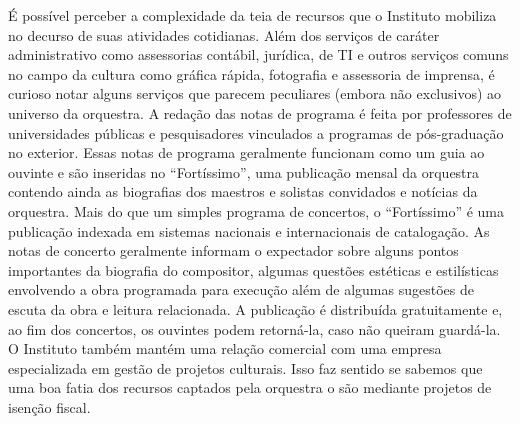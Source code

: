 \documentclass[a4paper, 12pt, openright, oneside, german, french, english, brazil]{abntex2}
\begin{document}






	É possível perceber a complexidade da teia de recursos que o Instituto mobiliza no decurso de suas atividades cotidianas. Além dos serviços de caráter administrativo como assessorias contábil, jurídica, de TI e outros serviços comuns no campo da cultura como gráfica rápida, fotografia e assessoria de imprensa, é curioso notar alguns serviços que parecem peculiares (embora não exclusivos) ao universo da orquestra. A redação das notas de programa é feita por professores de universidades públicas e pesquisadores vinculados a programas de pós-graduação no exterior. Essas notas de programa geralmente funcionam como um guia ao ouvinte e são inseridas no ``Fortíssimo'', uma publicação mensal da orquestra contendo ainda as biografias dos maestros e solistas convidados e notícias da orquestra. Mais do que um simples programa de concertos, o ``Fortíssimo'' é uma publicação indexada em sistemas nacionais e internacionais de catalogação. As notas de concerto geralmente informam o expectador sobre alguns pontos importantes da biografia do compositor, algumas questões estéticas e estilísticas envolvendo a obra programada para execução além de algumas sugestões de escuta da obra e leitura relacionada. A publicação é distribuída gratuitamente e, ao fim dos concertos, os ouvintes podem retorná-la, caso não queiram guardá-la. O Instituto também mantém uma relação comercial com uma empresa especializada em gestão de projetos culturais. Isso faz sentido se sabemos que uma boa fatia dos recursos captados pela orquestra o são mediante projetos de isenção fiscal.
\end{document}
